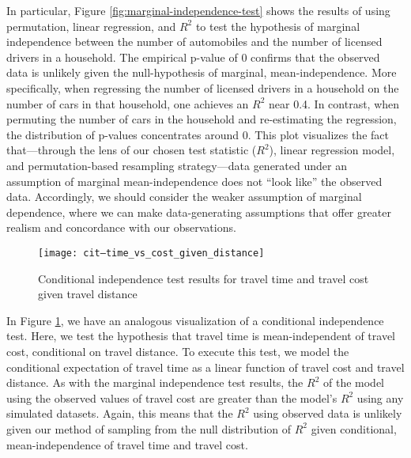 
In particular, Figure \ref{fig:marginal-independence-test} shows the results of using permutation, linear regression, and $R^2$ to test the hypothesis of marginal independence between the number of automobiles and the number of licensed drivers in a household.
The empirical p-value of 0 confirms that the observed data is unlikely given the null-hypothesis of marginal, mean-independence.
More specifically, when regressing the number of licensed drivers in a household on the number of cars in that household, one achieves an $R^2$ near 0.4.
In contrast, when permuting the number of cars in the household and re-estimating the regression, the distribution of p-values concentrates around 0.
This plot visualizes the fact that---through the lens of our chosen test statistic ($R^2$), linear regression model, and permutation-based resampling strategy---data generated under an assumption of marginal mean-independence does not ``look like'' the observed data.
Accordingly, we should consider the weaker assumption of marginal dependence, where we can make data-generating assumptions that offer greater realism and concordance with our observations.

\begin{figure}
   \centering
   \texttt{[image: cit--time\_vs\_cost\_given\_distance]}
   \caption{Conditional independence test results for travel time and travel cost given travel distance}
   \label{fig:conditional-independence-test}
\end{figure}
In Figure \ref{fig:conditional-independence-test}, we have an analogous visualization of a conditional independence test.
Here, we test the hypothesis that travel time is mean-independent of travel cost, conditional on travel distance.
To execute this test, we model the conditional expectation of travel time as a linear function of travel cost and travel distance.
As with the marginal independence test results, the $R^2$ of the model using the observed values of travel cost are greater than the model's $R^2$ using any simulated datasets.
Again, this means that the $R^2$ using observed data is unlikely given our method of sampling from the null distribution of $R^2$ given conditional, mean-independence of travel time and travel cost.

